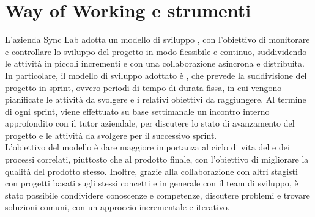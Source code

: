 \section{Way of Working e strumenti}\label{sec:way-of-working}
L'azienda Sync Lab adotta un modello di sviluppo , con l'obiettivo di monitorare e controllare lo sviluppo del progetto in modo flessibile e continuo, suddividendo le attività
in piccoli incrementi e con una collaborazione asincrona e distribuita. In particolare, il modello di sviluppo adottato è , che prevede la suddivisione del progetto in sprint,
ovvero periodi di tempo di durata fissa, in cui vengono pianificate le attività da svolgere e i relativi obiettivi da raggiungere. Al termine di ogni sprint, viene effettuato su base settimanale
un incontro interno approfondito con il tutor aziendale, per discutere lo stato di avanzamento del progetto e le attività da svolgere per il successivo sprint. \\

L'obiettivo del modello è dare maggiore importanza al ciclo di vita del  e dei processi correlati, piuttosto che al prodotto finale, con l'obiettivo di migliorare la qualità del prodotto stesso.
Inoltre, grazie alla collaborazione con altri stagisti con progetti basati sugli stessi concetti e in generale con il team di sviluppo, è stato possibile condividere conoscenze e competenze,
discutere problemi e trovare soluzioni comuni, con un approccio incrementale e iterativo. \\

